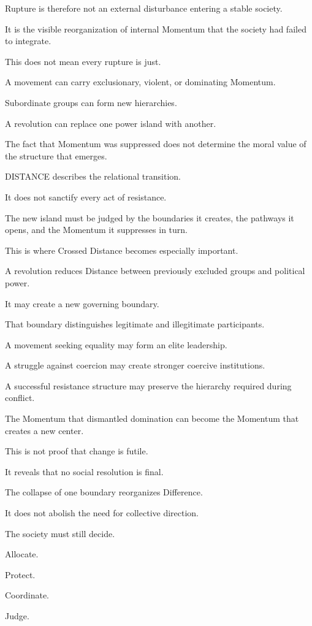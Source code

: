 Rupture is therefore not an external disturbance entering a stable society.

It is the visible reorganization of internal Momentum that the society had failed to integrate.

This does not mean every rupture is just.

A movement can carry exclusionary, violent, or dominating Momentum.

Subordinate groups can form new hierarchies.

A revolution can replace one power island with another.

The fact that Momentum was suppressed does not determine the moral value of the structure that emerges.

DISTANCE describes the relational transition.

It does not sanctify every act of resistance.

The new island must be judged by the boundaries it creates, the pathways it opens, and the Momentum it suppresses in turn.

This is where Crossed Distance becomes especially important.

A revolution reduces Distance between previously excluded groups and political power.

It may create a new governing boundary.

That boundary distinguishes legitimate and illegitimate participants.

A movement seeking equality may form an elite leadership.

A struggle against coercion may create stronger coercive institutions.

A successful resistance structure may preserve the hierarchy required during conflict.

The Momentum that dismantled domination can become the Momentum that creates a new center.

This is not proof that change is futile.

It reveals that no social resolution is final.

The collapse of one boundary reorganizes Difference.

It does not abolish the need for collective direction.

The society must still decide.

Allocate.

Protect.

Coordinate.

Judge.

